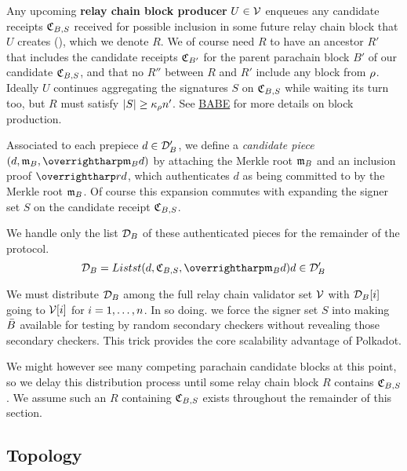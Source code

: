 \smallskip

Any upcoming {\bf relay chain block producer} $U \in \mathcal{V}$ enqueues any candidate receipts $\mathfrak{C}_{B,S}$ received for possible inclusion in some future relay chain block that $U$ creates (), which we denote $R$.  We of course need $R$ to have an ancestor $R'$ that includes the candidate receipts $\mathfrak{C}_{B'}$ for the parent parachain block $B'$ of our candidate $\mathfrak{C}_{B,S}$, and that no $R''$ between $R$ and $R'$ include any block from $\rho$.  Ideally $U$ continues aggregating the signatures $S$ on $\mathfrak{C}_{B,S}$ while waiting its turn too, but $R$ must satisfy $|S| \ge \kappa_{\rho} n'$.  See \href{http://research.web3.foundation/en/latest/polkadot/BABE/Babe/}{BABE} for more details on block production.

Associated to each prepiece $d \in \mathcal{D}'_B$, we define a {\em candidate piece} $(d,\merkleroot_B,\vect{\merkleroot_B d})$ by attaching the Merkle root $\mathfrak{m}_B$ and an inclusion proof $\vect{rd}$, which authenticates $d$ as being committed to by the Merkle root $\mathfrak{m}_B$.  Of course this expansion commutes with expanding the signer set $S$ on the candidate receipt $\mathfrak{C}_{B,S}$.

We handle only the list $\mathcal{D}_B$ of these authenticated pieces for the remainder of the protocol. 
$$ \pieces_B = Listst{ (d,\reciept_{B,S},\vect{\merkleroot_B d}) }{ d \in \prepieces_B } $$

We must distribute $\mathcal{D}_B$ among the full relay chain validator set $\mathcal{V}$ with $\mathcal{D}_B[i]$ going to $\mathcal{V}[i]$ for $i = 1,\ldots,n$.  In so doing. we force the signer set $S$ into making $\bar{B}$ available for testing by random secondary checkers without revealing those secondary checkers.  This trick provides the core scalability advantage of Polkadot.

We might however see many competing parachain candidate blocks at this point, so we delay this distribution process until some relay chain block $R$ contains $\mathfrak{C}_{B,S}$.  We assume such an $R$ containing $\mathfrak{C}_{B,S}$ exists throughout the remainder of this section.


\subsection{Topology}

